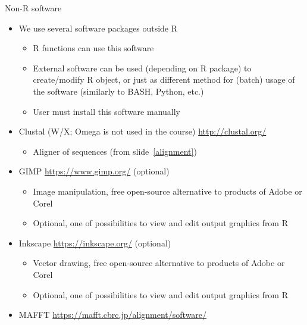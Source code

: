 \documentclass[compress, xelatex, 11pt, xcolor=svgnames, aspectratio=169, url={hyphens, lowtilde}]{beamer}
\renewcommand{\texttt}[1]{\colorbox{Beige}{{\ttfamily #1}}}
\begin{document}
\begin{frame}[allowframebreaks]{Non-R software}
	\begin{itemize}
		\item We use several software packages outside R
		\begin{itemize}
			\item R functions can use this software
			\item External software can be used (depending on R package) to create/modify R object, or just as different method for (batch) usage of the software (similarly to BASH, Python, etc.)
			\item User must install this software manually
		\end{itemize}
		\item Clustal (W/X; Omega is not used in the course) \url{http://clustal.org/}
		\begin{itemize}
			\item Aligner of sequences (from slide~\ref{alignment})
		\end{itemize}
		\item GIMP \url{https://www.gimp.org/} (optional)
		\begin{itemize}
			\item Image manipulation, free open-source alternative to products of Adobe or Corel
			\item Optional, one of possibilities to view and edit output graphics from R
		\end{itemize}
		\item Inkscape \url{https://inkscape.org/} (optional)
		\begin{itemize}
			\item Vector drawing, free open-source alternative to products of Adobe or Corel
			\item Optional, one of possibilities to view and edit output graphics from R
		\end{itemize}
		\item MAFFT \url{https://mafft.cbrc.jp/alignment/software/}

\end{itemize}
\end{frame}
\end{document}

